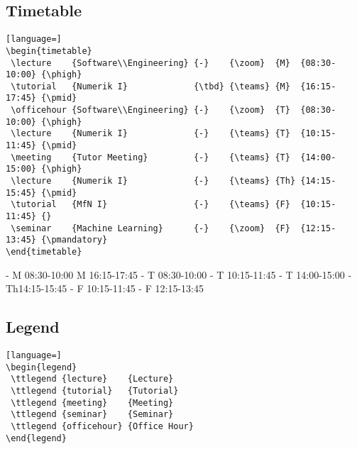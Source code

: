 \documentclass[english]{article}
\begin{document}
	\subsection{Timetable}
	\begin{lstlisting}[language=]
\begin{timetable}			
 \lecture    {Software\\Engineering} {-}    {\zoom}  {M}  {08:30-10:00} {\phigh}		
 \tutorial   {Numerik I}             {\tbd} {\teams} {M}  {16:15-17:45} {\pmid}
 \officehour {Software\\Engineering} {-}    {\zoom}  {T}  {08:30-10:00} {\phigh}	
 \lecture    {Numerik I}             {-}    {\teams} {T}  {10:15-11:45} {\pmid}	
 \meeting    {Tutor Meeting}         {-}    {\teams} {T}  {14:00-15:00} {\phigh}	
 \lecture    {Numerik I}             {-}    {\teams} {Th} {14:15-15:45} {\pmid}	
 \tutorial   {MfN I}                 {-}    {\teams} {F}  {10:15-11:45} {}
 \seminar    {Machine Learning}      {-}    {\zoom}  {F}  {12:15-13:45} {\pmandatory}	
\end{timetable}		
	\end{lstlisting}	
	\begin{timetable}			
						{-}		{\teams}			{M}	{08:30-10:00}	{\phigh}		
									{\tbd}	{\teams}			{M}	{16:15-17:45}	{\pmid}
						{-}		{\teams}			{T}	{08:30-10:00}	{\phigh}	
									{-}		{\teams}			{T}	{10:15-11:45}	{\pmid}	
								{-}		{\teams}			{T}	{14:00-15:00}	{\phigh}	
									{-}		{\teams}			{Th}{14:15-15:45}	{\pmid}	
										{-}		{\teams}			{F}	{10:15-11:45}	{}
							{-}		{\teams}			{F}	{12:15-13:45}	{\pmandatory}	
	\end{timetable}
	
	\pagebreak
	\subsection{Legend}
	\begin{lstlisting}[language=]
\begin{legend}
 \ttlegend {lecture}    {Lecture}
 \ttlegend {tutorial}   {Tutorial}
 \ttlegend {meeting}    {Meeting}
 \ttlegend {seminar}    {Seminar}
 \ttlegend {officehour} {Office Hour}
\end{legend}		
	\end{lstlisting}
	\begin{legend}
	\end{legend}
	
\end{document}
